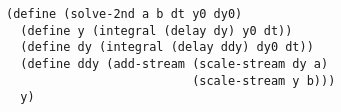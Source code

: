 \documentclass[a4paper,12pt]{article}
\begin{document}
\begin{lstlisting}
(define (solve-2nd a b dt y0 dy0)
  (define y (integral (delay dy) y0 dt))
  (define dy (integral (delay ddy) dy0 dt))
  (define ddy (add-stream (scale-stream dy a)
                          (scale-stream y b)))
  y)
\end{lstlisting}
\end{document}
